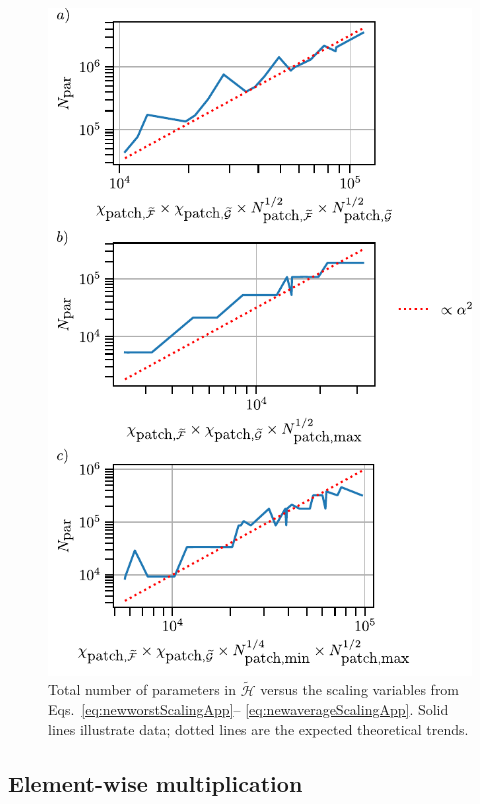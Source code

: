 \begin{figure}[htpb]
    \centering
    \includegraphics{figures/patchedMulMemoryScaling.pdf}
    \caption{Total number of parameters in
           \(\widetilde{\mathcal H}\) versus the scaling variables from
           Eqs.~\eqref{eq:newworstScalingApp}–
           \eqref{eq:newaverageScalingApp}.  Solid lines illustrate data; dotted lines are the expected
           theoretical trends.}
    \label{fig:patchedMulMemoryScaling}
\end{figure}


\subsection{Element-wise multiplication}


